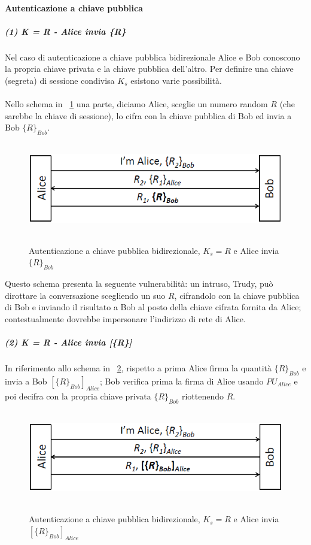 \paragraph{Autenticazione a chiave pubblica}
\subparagraph{(1) \textit{K = R} - Alice invia \textit{\{R\}}}
\label{subsec:caso1}
Nel caso di autenticazione a chiave pubblica bidirezionale Alice e Bob conoscono la propria chiave privata e la chiave pubblica dell'altro. Per definire una chiave (segreta) di sessione condivisa $K_{s}$ esistono varie possibilità.\\ \\
Nello schema in \figurename~\ref{fig:ImgS67bis} una parte, diciamo Alice, sceglie un numero random $R$ (che sarebbe la chiave di sessione), lo cifra con la chiave pubblica di Bob ed invia a Bob $\lbrace R\rbrace_{Bob}$.
\begin{figure}[htbp]
	\centering%
	\subfigure%
	{\includegraphics[height=4cm, width=12cm, keepaspectratio]{Immagini/autenticazione/ImgS67bis.png}}
	\caption{Autenticazione a chiave pubblica bidirezionale, $K_{s} = R$ e Alice invia $\lbrace R\rbrace_{Bob}$}\label{fig:ImgS67bis} 	
\end{figure}
Questo schema presenta la seguente vulnerabilità: un intruso, Trudy, può dirottare la conversazione scegliendo un suo $R$, cifrandolo con la chiave pubblica di Bob e inviando il risultato a Bob al posto della chiave cifrata fornita da Alice; contestualmente dovrebbe impersonare l'indirizzo di rete di Alice.
\subparagraph{(2) \textit{K} = R - Alice invia \textit{[\{R\}]}}
In riferimento allo schema in \figurename~\ref{fig:ImgS69bis}, rispetto a prima Alice firma la quantità $\lbrace R\rbrace_{Bob}$ e invia a Bob $[\lbrace R\rbrace_{Bob}]_{Alice}$; Bob verifica prima la firma di Alice usando $PU_{Alice}$ e poi decifra con la propria chiave privata $\lbrace R\rbrace_{Bob}$ riottenendo $R$.
\begin{figure}[htbp]
	\centering%
	\subfigure%
	{\includegraphics[height=4cm, width=12cm, keepaspectratio]{Immagini/autenticazione/ImgS69bis.png}}
	\caption{Autenticazione a chiave pubblica bidirezionale, $K_{s} = R$ e Alice invia $[\lbrace R\rbrace_{Bob}]_{Alice}$}\label{fig:ImgS69bis} 	
\end{figure}
